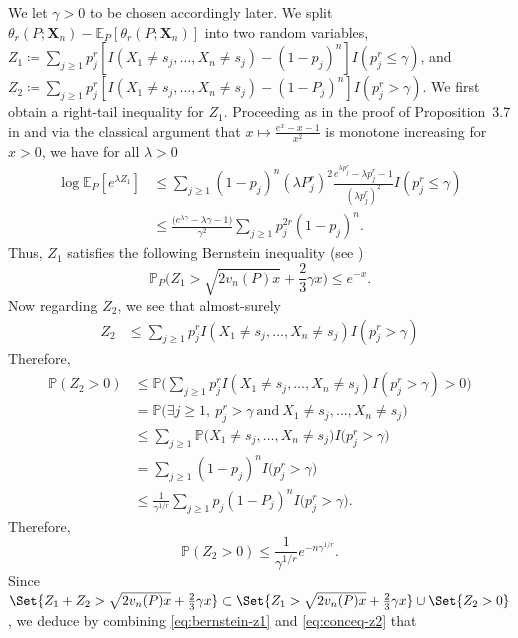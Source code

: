 \documentclass{article}
\newcommand{\1}{\boldsymbol{1}}
\newcommand{\EE}{\mathbb{E}}
\newcommand{\PP}{\mathbb{P}}
\theoremstyle{plain}
\begin{document}
  We let $\gamma > 0$ to be chosen accordingly later. We split $\theta_r(P;\mathbf{X}_n) - \EE_P[\theta_r(P;\mathbf{X}_n)]$ into two random variables, $Z_1 \coloneqq \sum_{j\geq 1}p_j^r[I(X_1\ne s_j,\dots,X_n\ne s_j) - (1-p_j)^n]I(p_j^r \leq \gamma)$, and $Z_2 \coloneqq \sum_{j\geq 1}p_j^r[I(X_1\ne s_j,\dots,X_n\ne s_j) - (1-P_j)^n]I(p_j^r > \gamma)$. We first obtain a right-tail inequality for $Z_1$. Proceeding as in the proof of Proposition~3.7 in \cite{Ben(17)} and via the classical argument that $x \mapsto \frac{e^x - x - 1}{x^2}$ is monotone increasing for $x > 0$, we have for all $\lambda > 0$
  \begin{align*}
    \log\EE_P[e^{\lambda Z_1}]%
    &\leq \sum_{j\geq 1}(1 - p_j)^n (\lambda P_j^{r})^2\frac{e^{\lambda p_j^r} - \lambda p_j^r - 1}{(\lambda p_j^r)^2}I(p_j^r \leq \gamma)\\
    &\leq \frac{\big(e^{\lambda \gamma} - \lambda \gamma - 1 \big)}{\gamma^2}%
      \sum_{j\geq 1} p_j^{2r}(1 - p_j)^n.
  \end{align*}
  Thus, $Z_1$ satisfies the following Bernstein inequality (see \cite{BLM(13)})
  \begin{equation}
    \label{eq:bernstein-z1}
    \PP_P\Big(Z_1 > \sqrt{2 v_n(P) x} + \frac{2}{3}\gamma x \Big) \leq e^{-x}.
  \end{equation}
  Now regarding $Z_2$, we see that almost-surely
  \begin{align*}
    Z_2%
    &\leq \sum_{j\geq 1}p_j^rI(X_1\ne s_j,\dots,X_n\ne s_j)I( p_j^r > \gamma)
  \end{align*}
  Therefore,
  \begin{align*}
    \PP(Z_2 > 0)%
    &\leq \PP\Bigg(\sum_{j\geq 1}p_j^rI(X_1\ne s_j,\dots,X_n\ne s_j)I( p_j^r > \gamma) > 0 \Bigg)\\
    &= \PP\Big( \exists j\geq 1,\ p_j^r > \gamma\ \mathrm{and}\ X_1 \ne s_j,\dots,X_n \ne s_j  \Big)\\
    &\leq \sum_{j\geq 1}\PP\big(X_1\ne s_j,\dots,X_n\ne s_j \big)I(p_j^r > \gamma\big)\\
    &= \sum_{j\geq 1}(1 - p_j)^nI(p_j^r > \gamma\big)\\
    &\leq \frac{1}{\gamma^{1/r}}\sum_{j\geq 1}p_j(1 - P_j)^nI(p_j^r > \gamma\big).
  \end{align*}
  Therefore,
  \begin{equation}
    \label{eq:conceq-z2}
    \PP(Z_2 > 0) \leq \frac{1}{\gamma^{1/r}}e^{-n\gamma^{1/r}}.
  \end{equation}
  Since $\Set{Z_1 + Z_2 > \sqrt{2v_n(P)x} + \frac{2}{3}\gamma x} \subset \Set{Z_1 > \sqrt{2v_n(P)x} + \frac{2}{3}\gamma x}\cup \Set{Z_2 > 0}$, we deduce by combining \eqref{eq:bernstein-z1} and \eqref{eq:conceq-z2} that
\end{document}

